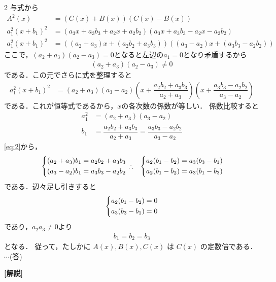 \documentclass[../../main.tex]{subfiles}
\begin{document}
\begin{multicols}{2}
  与式から
  \begin{align}
    A^2(x)              & = (C(x) + B(x))(C(x) - B(x))                                     \\
    a^2_1(x + b_1)^2 & = (a_3x + a_3b_3 + a_2x + a_2b_2)(a_3x + a_3b_3 - a_2x - a_2b_2) \\
    a^2_1(x + b_1)^2 & = ((a_2+a_3)x + (a_2b_2+a_3b_3))((a_3-a_2)x + (a_3b_3-a_2b_2))
  \end{align}
  ここで，$(a_2+a_3)(a_2-a_3)=0$となると左辺の$a_1=0$となり矛盾するから
  \begin{align}
    (a_2+a_3)(a_2-a_3) \neq 0
  \end{align}
  である．この元でさらに式を整理すると
  \begin{align}
    a^2_1(x + b_1)^2 & = (a_2+a_3)(a_3-a_2)\left(x+\dfrac{a_2b_2+a_3b_3}{a_2+a_3}\right)\left(x+\dfrac{a_3b_3-a_2b_2}{a_3-a_2}\right)
  \end{align}
  である．これが恒等式であるから，$x$の各次数の係数が等しい．
  係数比較すると
  \begin{align}
    a^2_1 & = (a_2+a_3)(a_3-a_2) \label{eq:1}              \\
    b_1   & = \dfrac{a_2b_2+a_3b_3}{a_2+a_3}
    = \dfrac{a_3b_3-a_2b_2}{a_3-a_2} \label{eq:2}
  \end{align}
  \cref{eq:2}から，
  \begin{align}
    &
    \begin{dcases}
      (a_2+a_3)b_1 = a_2b_2+a_3b_3 \\
      (a_3-a_2)b_1 = a_3b_3-a_2b_2
    \end{dcases}
    \therefore
    &
    \begin{dcases}
      a_2(b_1-b_2) = a_3(b_3-b_1) \\
      a_2(b_1-b_2) = a_3(b_1-b_3)
    \end{dcases}
  \end{align}
  である．辺々足し引きすると
  \begin{align}
    \begin{dcases}
      a_2(b_1-b_2) = 0 \\
      a_3(b_3-b_1) = 0
    \end{dcases}
  \end{align}
  であり，$a_2a_3\neq 0$より
  \begin{align}
    b_1=b_2=b_3
  \end{align}
  となる．
  従って，たしかに $A(x), B(x), C(x)$ は $C(x)$ の定数倍である． $\cdots$(答)

  {\bf [解説]}

  \newpage
\end{multicols}
\end{document}
